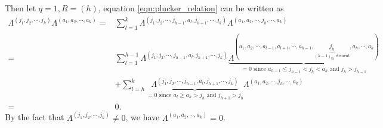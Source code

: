\documentclass[11pt]{homework}
\begin{document}
Then let $q = 1, R = (h)$, equation \ref{eqn:plucker_relation} can be written as
\begin{align*}
    \Lambda^{(j_1,j_2, \cdots, j_k)} \Lambda^{(a_1, a_2, \cdots, a_k)} =& \sum_{l=1}^{k} \Lambda^{(j_1,j_2, \cdots, j_{h-1}, a_{l}, j_{h+1}, \cdots, j_k)} \Lambda^{(a_1, a_2, \cdots, j_h, \cdots, a_k)}\\
    =& \sum_{l=1}^{h-1} \Lambda^{(j_1,j_2, \cdots, j_{h-1}, a_{l}, j_{h+1}, \cdots, j_k)} \underbrace{\Lambda^{(a_1, a_2, \cdots, a_{l-1}, a_{l+1}, \cdots, a_{h-1}, \underbrace{j_h}_{(h-1)_{\text{th}} \text{ element}}, a_h, \cdots, a_k)}}_{=0 \text{ since } a_{h-1} \leq j_{h-1} < j_h < a_h \text{ and } j_h > j_{h-1}}   \\ 
    &+ \sum_{l=h}^{k} \underbrace{\Lambda^{(j_1,j_2, \cdots, j_{h-1}, a_{l}, j_{h+1}, \cdots, j_k)}}_{=0 \text{ since } a_l \geq a_h > j_h \text{ and } j_{h+1} > j_h } \Lambda^{(a_1, a_2, \cdots, j_h, \cdots, a_k)}\\
    =&0.
\end{align*}
By the fact that $\Lambda^{(j_1,j_2, \cdots, j_k)} \neq 0$, we have $\Lambda^{(a_1, a_2, \cdots, a_k)}=0$.



\end{document}
